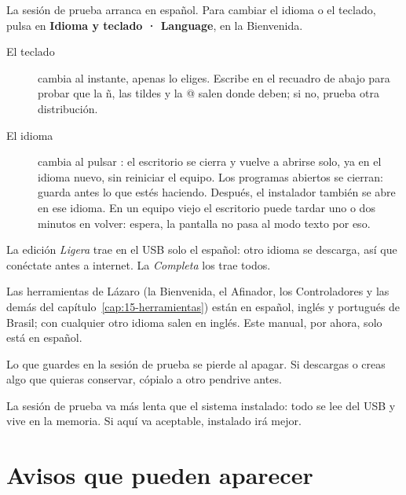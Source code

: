 La sesión de prueba arranca en español. Para cambiar el idioma o el
teclado, pulsa  en \textbf{Idioma y teclado · Language},
en la Bienvenida.


\begin{description}
  \item[El teclado] cambia al instante, apenas lo eliges. Escribe en el
    recuadro de abajo para probar que la ñ, las tildes y la @ salen donde
    deben; si no, prueba otra distribución.
  \item[El idioma] cambia al pulsar : el escritorio
    se cierra y vuelve a abrirse solo, ya en el idioma
    nuevo, sin reiniciar el equipo. Los programas abiertos se cierran:
    guarda antes lo que estés haciendo. Después, el instalador también se
    abre en ese idioma. En un equipo viejo el escritorio puede tardar uno
    o dos minutos en volver: espera, la pantalla no pasa al modo texto
    por eso.
\end{description}

La edición \emph{Ligera} trae en el USB solo el español: otro idioma se
descarga, así que conéctate antes a internet. La \emph{Completa} los trae
todos.

Las herramientas de Lázaro (la Bienvenida, el Afinador, los
Controladores y las demás del capítulo~\ref{cap:15-herramientas}) están
en español, inglés y portugués de Brasil; con cualquier otro idioma
salen en inglés. Este manual, por ahora, solo está en español.

\begin{cuidado}
Lo que guardes en la sesión de prueba se pierde al apagar. Si descargas o
creas algo que quieras conservar, cópialo a otro pendrive antes.
\end{cuidado}

\begin{nota}
La sesión de prueba va más lenta que el sistema instalado: todo se lee del
USB y vive en la memoria. Si aquí va aceptable, instalado irá mejor.
\end{nota}

\section{Avisos que pueden aparecer}

